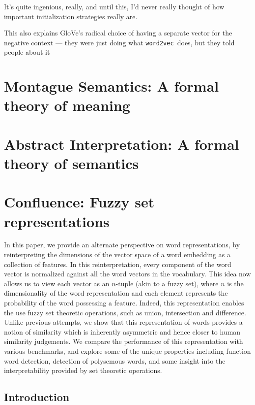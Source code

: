 \documentclass[11pt]{book}
\newcommand{\wtov}{\texttt{word2vec }}
\begin{document}
It's quite ingenious, really, and until this, I'd never really thought of
how important initialization strategies really are.


This also explains GloVe's radical choice of having a separate vector
for the negative context --- they were just doing what \wtov does, but
they told people about it 


\chapter{Montague Semantics: A formal theory of meaning}

\chapter{Abstract Interpretation: A formal theory of semantics}


\chapter{Confluence: Fuzzy set representations}
In this paper, we provide an alternate perspective on word representations, by
reinterpreting the dimensions of the vector space of a word embedding as a
collection of features. In this reinterpretation, every component of the word
vector is normalized against all the word vectors in the vocabulary. This idea
now allows us to view each vector as an $n$-tuple (akin to a fuzzy set), where
$n$ is the dimensionality of the word representation and each element
represents the probability of the word possessing a feature. Indeed, this
representation enables the use fuzzy set theoretic operations, such as union,
intersection and difference. Unlike previous attempts, we show that this
representation of words provides a notion of similarity which is inherently
asymmetric and hence closer to human similarity judgements. We compare the
performance of this representation with various benchmarks, and explore some of
the unique properties including function word detection, detection of
polysemous words, and some insight into the interpretability provided by set
theoretic operations.

\section{Introduction} \label{sec: intro}
\end{document}
